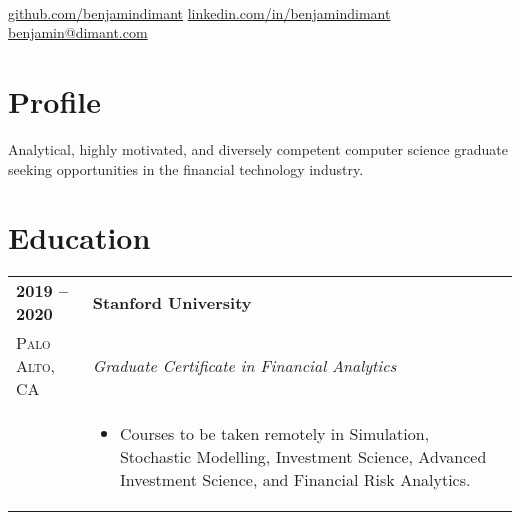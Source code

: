 \documentclass[a4paper, 10pt, oneside]{article}
\begin{document}

\begin{center}
\color{headings}\textsc{\Huge{}} \\

\vspace*{5pt}
\color{text1}{\faGithub} \href{https://github.com/benjamindimant}{github.com/benjamindimant} \hfill {\faLinkedinSquare} \href{http://linkedin.com/in/benjamindimant}{linkedin.com/in/benjamindimant} \hfill {\Large\Letter} \href{mailto:benjamin@dimant.com}{benjamin@dimant.com} 

\vspace*{-10pt}


\section{Profile}

\begin{flushleft}
Analytical, highly motivated, and diversely competent computer science graduate seeking opportunities in the financial technology industry.

\end{flushleft}

\vspace*{-20pt}

\section{Education}

\begin{tabularx}{1\linewidth}{>{\raggedleft\scshape}p{3.2cm}X}
\textbf{2019 -- 2020} & \textbf{Stanford University} \\
Palo Alto, CA            & \textit{Graduate Certificate in Financial Analytics} \\ 
&\vspace*{-5pt}
\begin{itemize}
\item Courses to be taken remotely in Simulation, Stochastic Modelling, Investment Science, Advanced Investment Science, and Financial Risk Analytics.
\end{itemize}
\end{tabularx}


\end{center}
\end{document}
